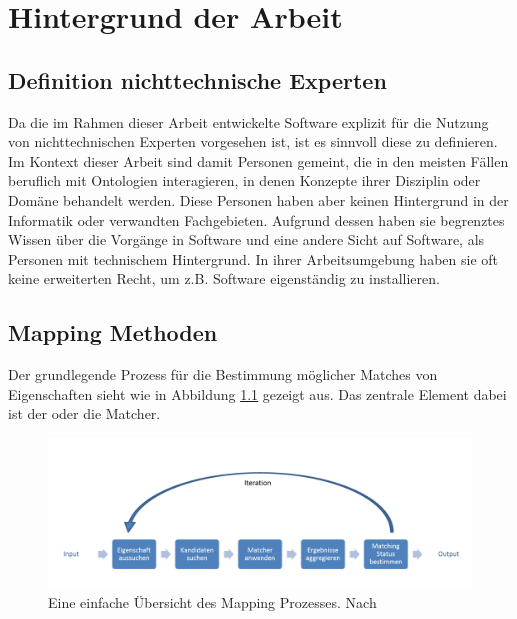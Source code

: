 %
\chapter{Hintergrund der Arbeit}
\label{chap:background}

	\section{Definition nichttechnische Experten}
	Da die im Rahmen dieser Arbeit entwickelte Software explizit für die Nutzung
	von nichttechnischen Experten vorgesehen ist, ist es sinnvoll diese zu definieren.
	Im Kontext dieser Arbeit sind damit Personen gemeint, die in den meisten Fällen
	beruflich mit Ontologien interagieren, in denen Konzepte ihrer Disziplin oder
	Domäne behandelt werden. Diese Personen haben aber keinen Hintergrund in der
	Informatik oder verwandten Fachgebieten. Aufgrund dessen haben sie begrenztes
	Wissen über die Vorgänge in Software und eine andere Sicht auf Software, als
	Personen mit technischem Hintergrund. In ihrer Arbeitsumgebung haben sie oft
	keine erweiterten Recht, um z.B. Software eigenständig zu installieren.

	\section{Mapping Methoden}
	Der grundlegende Prozess für die Bestimmung möglicher Matches von Eigenschaften
	sieht wie in Abbildung \ref{fig1} gezeigt aus. Das zentrale Element dabei ist
	der oder die Matcher. \cite{Hoo14}
	
	\begin{figure}[ht]
	\centering
	\includegraphics[width=1.0\textwidth]{pics/simple-high-level-view-of-a-mapping-process.png}
	\caption{Eine einfache Übersicht des Mapping Prozesses. Nach \cite{Hoo14}}
	\label{fig1}
	\end{figure}
	
